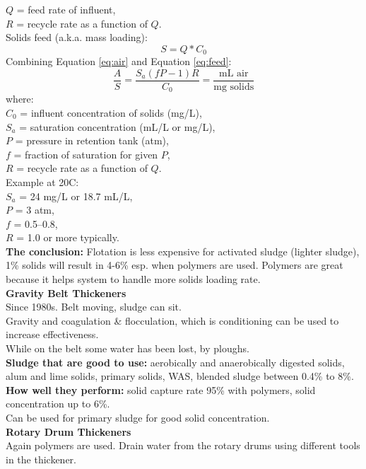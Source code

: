 \documentclass{article}
\numberwithin{equation}{section}
\begin{document}
$Q$ = feed rate of influent,\\
$R$ = recycle rate as a function of $Q$.\\
Solids feed (a.k.a. mass loading):
\begin{equation}
    S = Q*C_0 \label{eq:feed}
\end{equation}
Combining Equation \ref{eq:air} and Equation \ref{eq:feed}:
\[
\frac{A}{S} = \frac{S_a(fP-1)R}{C_0} = \frac{\text{mL air}}{\text{mg solids}}
\]
where:\\
$C_0$ = influent concentration of solids (mg/L),\\
$S_a$ = saturation concentration (mL/L or mg/L),\\
$P$ = pressure in retention tank (atm),\\
$f$ = fraction of saturation for given $P$,\\
$R$ = recycle rate as a function of $Q$.\\
Example at 20\textdegree C:\\
$S_a$ = 24 mg/L or 18.7 mL/L,\\
$P$ = 3 atm,\\
$f$ = 0.5--0.8,\\
$R$ = 1.0 or more typically.\\
\textbf{The conclusion:} Flotation is less expensive for activated sludge (lighter sludge), 1\% solids will result in 4-6\% esp. when polymers are used. Polymers are great because it helps system to handle more solids loading rate.\\
\textbf{Gravity Belt Thickeners}\\
Since 1980s. Belt moving, sludge can sit.\\
Gravity and coagulation \& flocculation, which is conditioning can be used to increase effectiveness.\\
While on the belt some water has been lost, by ploughs.\\
\textbf{Sludge that are good to use:} aerobically and anaerobically digested solids, alum and lime solids, primary solids, WAS, blended sludge between 0.4\% to 8\%.\\
\textbf{How well they perform:} solid capture rate 95\% with polymers, solid concentration up to 6\%.\\
Can be used for primary sludge for good solid concentration.\\
\textbf{Rotary Drum Thickeners}\\
Again polymers are used. Drain water from the rotary drums using different tools in the thickener.\\
\end{document}
